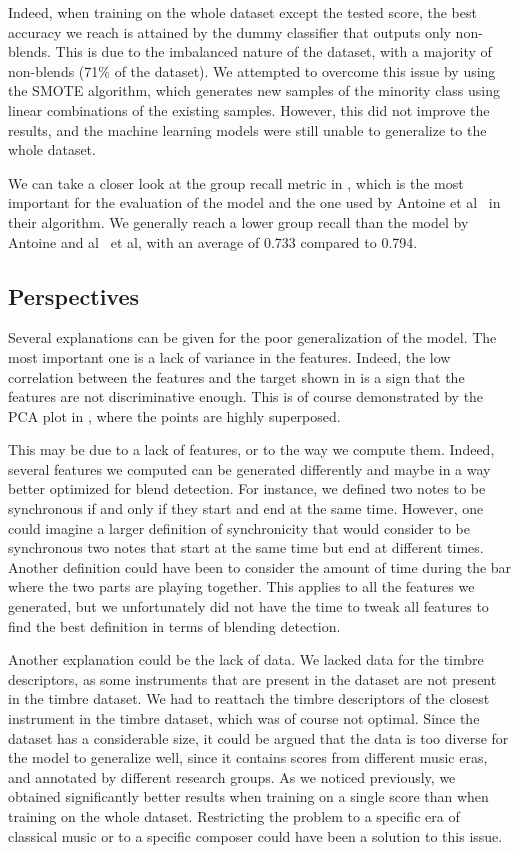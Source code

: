 \documentclass{article}
\begin{document}
Indeed, when training on the whole dataset except the tested score, the best accuracy we reach is attained by the dummy classifier that outputs only non-blends.
This is due to the imbalanced nature of the dataset, with a majority of non-blends (71\% of the dataset).
We attempted to overcome this issue by using the SMOTE algorithm, which generates new samples of the minority class using linear combinations of the existing samples.
However, this did not improve the results, and the machine learning models were still unable to generalize to the whole dataset.

We can take a closer look at the group recall metric in , which is the most important for the evaluation of the model and the one used by Antoine et al~\cite{antoine_blends} in their algorithm.
We generally reach a lower group recall than the model by Antoine and al~\cite{antoine_blends} et al, with an average of 0.733 compared to 0.794.


\subsection{Perspectives}

Several explanations can be given for the poor generalization of the model. The most important one is a lack of variance in the features.
Indeed, the low correlation between the features and the target shown in  is a sign that the features are not discriminative enough.
This is of course demonstrated by the PCA plot in , where the points are highly superposed.


This may be due to a lack of features, or to the way we compute them. Indeed, several features we computed can be generated differently and maybe in a way better optimized for blend detection.
For instance, we defined two notes to be synchronous if and only if they start and end at the same time.
However, one could imagine a larger definition of synchronicity that would consider to be synchronous two notes that start at the same time but end at different times.
Another definition could have been to consider the amount of time during the bar where the two parts are playing together.
This applies to all the features we generated, but we unfortunately did not have the time to tweak all features to find the best definition in terms of blending detection.


Another explanation could be the lack of data. We lacked data for the timbre descriptors, as some instruments that are present in the dataset are not present in the timbre dataset.
We had to reattach the timbre descriptors of the closest instrument in the timbre dataset, which was of course not optimal.
Since the dataset has a considerable size, it could be argued that the data is too diverse for the model to generalize well, since it contains scores from different music eras, and annotated by different research groups.
As we noticed previously, we obtained significantly better results when training on a single score than when training on the whole dataset.
Restricting the problem to a specific era of classical music or to a specific composer could have been a solution to this issue.
\end{document}
